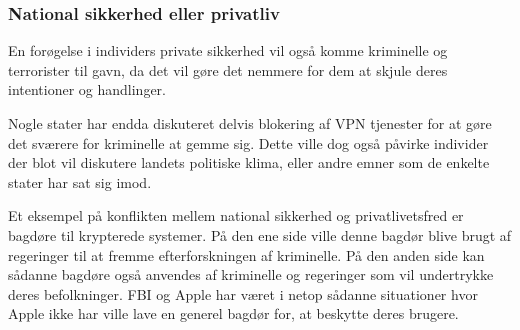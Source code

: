 \subsubsection{National sikkerhed eller privatliv}
En forøgelse i individers private sikkerhed vil også komme kriminelle og terrorister til gavn, da det vil gøre det nemmere for dem at skjule deres intentioner og handlinger.

Nogle stater har endda diskuteret delvis blokering af VPN tjenester for at gøre det sværere for kriminelle at gemme sig. Dette ville dog også påvirke individer der blot vil diskutere landets politiske klima, eller andre emner som de enkelte stater har sat sig imod.

Et eksempel på konflikten mellem national sikkerhed og privatlivetsfred er bagdøre til krypterede systemer. På den ene side ville denne bagdør blive brugt af regeringer til at fremme efterforskningen af kriminelle. På den anden side kan sådanne bagdøre også anvendes af kriminelle og regeringer som vil undertrykke deres befolkninger. FBI og Apple har været i netop sådanne situationer hvor Apple ikke har ville lave en generel bagdør for, at beskytte deres brugere.\cite{FBI/Apple_encryption}


